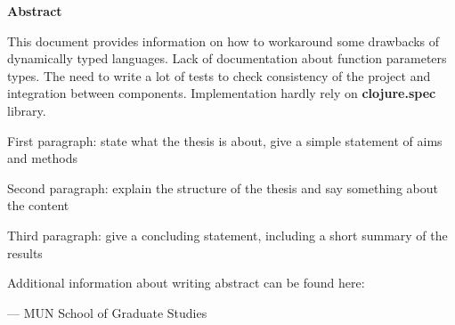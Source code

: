\begin{center}
\textbf{\large Abstract}
\end{center}

This document provides information on how to workaround some drawbacks of
dynamically typed languages. Lack of documentation about function parameters
types. The need to write a lot of tests to check consistency of the project and
integration between components. Implementation hardly rely on
\textbf{clojure.spec} library.

First paragraph: state what the thesis is about, give a simple statement of aims and
methods

Second paragraph: explain the structure of the thesis and say something about the
content

Third paragraph: give a concluding statement, including a short summary of the
results

Additional information about writing abstract can be found here: \\

\vspace{1cm}


\hfill --- MUN School of Graduate Studies
